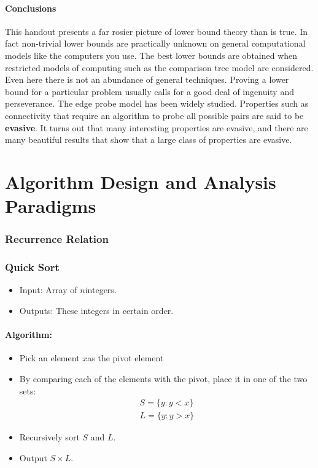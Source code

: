\documentclass[en,hazy,blue,screen,14pt]{elegantnote}
\begin{document}
\subsection{Conclusions }

This handout presents a far rosier picture of lower bound theory than
is true. In fact non-trivial lower bounds are practically unknown
on general computational models like the computers you use. The best
lower bounds are obtained when restricted models of computing such
as the comparison tree model are considered. Even here there is not
an abundance of general techniques. Proving a lower bound for a particular
problem usually calls for a good deal of ingenuity and perseverance.
The edge probe model has been widely studied. Properties such as connectivity
that require an algorithm to probe all possible pairs are said to
be \textbf{evasive}. It turns out that many interesting properties
are evasive, and there are many beautiful results that show that a
large class of properties are evasive. 

\part{Algorithm Design and Analysis Paradigms}

\section{Recurrence Relation}

\section{Quick Sort}
\begin{itemize}
\item Input: Array of $n$integers.
\item Outputs: These integers in certain order.
\end{itemize}

\subsection{Algorithm:}
\begin{itemize}
\item Pick an element $x$as the pivot element
\item By comparing each of the elements with the pivot, place it in one
of the two sets:
\begin{align*}
 S=\{y:y<x\}\\
 L=\{y:y>x\}
\end{align*}
\item Recursively sort $S$ and $L$.
\item Output $S\times L$.
\end{itemize}
\end{document}
